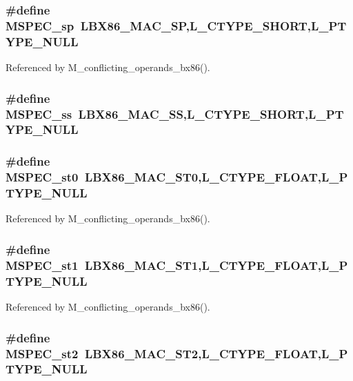 \subsubsection{\setlength{\rightskip}{0pt plus 5cm}\#define MSPEC\_\-sp~LBX86\_\-MAC\_\-SP,L\_\-CTYPE\_\-SHORT,L\_\-PTYPE\_\-NULL}\label{ml__bx86_8c_a484e005a0c35176d36aeb9e346cf7ab}




Referenced by M\_\-conflicting\_\-operands\_\-bx86().
\subsubsection{\setlength{\rightskip}{0pt plus 5cm}\#define MSPEC\_\-ss~LBX86\_\-MAC\_\-SS,L\_\-CTYPE\_\-SHORT,L\_\-PTYPE\_\-NULL}\label{ml__bx86_8c_0b79c88d529457b1c1d4395df628c1f1}


\subsubsection{\setlength{\rightskip}{0pt plus 5cm}\#define MSPEC\_\-st0~LBX86\_\-MAC\_\-ST0,L\_\-CTYPE\_\-FLOAT,L\_\-PTYPE\_\-NULL}\label{ml__bx86_8c_892689deedf2ca58b954bcb21d63eb92}




Referenced by M\_\-conflicting\_\-operands\_\-bx86().
\subsubsection{\setlength{\rightskip}{0pt plus 5cm}\#define MSPEC\_\-st1~LBX86\_\-MAC\_\-ST1,L\_\-CTYPE\_\-FLOAT,L\_\-PTYPE\_\-NULL}\label{ml__bx86_8c_00e3462fd9d7d53f5cf98ba5d0bc5846}




Referenced by M\_\-conflicting\_\-operands\_\-bx86().
\subsubsection{\setlength{\rightskip}{0pt plus 5cm}\#define MSPEC\_\-st2~LBX86\_\-MAC\_\-ST2,L\_\-CTYPE\_\-FLOAT,L\_\-PTYPE\_\-NULL}\label{ml__bx86_8c_74c8bc50a54a62984754db884958e5a6}




